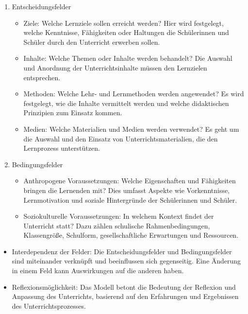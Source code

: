 \begin{enumerate}

	\item Entscheidungsfelder

		\begin{itemize}

			\item Ziele: Welche Lernziele sollen erreicht werden? Hier wird festgelegt, welche Kenntnisse, F\"{a}higkeiten oder Haltungen die Sch\"{u}lerinnen und Sch\"{u}ler durch den Unterricht erwerben sollen.

			\item Inhalte: Welche Themen oder Inhalte werden behandelt? Die Auswahl und Anordnung der Unterrichtsinhalte m\"{u}ssen den Lernzielen entsprechen.

			\item Methoden: Welche Lehr- und Lernmethoden werden angewendet? Es wird festgelegt, wie die Inhalte vermittelt werden und welche didaktischen Prinzipien zum Einsatz kommen.

			\item Medien: Welche Materialien und Medien werden verwendet? Es geht um die Auswahl und den Einsatz von Unterrichtsmaterialien, die den Lernprozess unterst\"{u}tzen.

		\end{itemize}



	\item Bedingungsfelder

		\begin{itemize}

			\item	 Anthropogene Voraussetzungen: Welche Eigenschaften und F\"{a}higkeiten bringen die Lernenden mit? Dies umfasst Aspekte wie Vorkenntnisse, Lernmotivation und soziale Hintergr\"{u}nde der Sch\"{u}lerinnen und Sch\"{u}ler.

			\item Soziokulturelle Voraussetzungen: In welchem Kontext findet der Unterricht statt? Dazu z\"{a}hlen schulische Rahmenbedingungen, Klassengr\"{o}{\ss}e, Schulform, gesellschaftliche Erwartungen und Ressourcen.

		\end{itemize}

\end{enumerate}	




\begin{itemize}

	\item Interdependenz der Felder: Die Entscheidungsfelder und Bedingungsfelder sind miteinander verkn\"{u}pft und beeinflussen sich gegenseitig. Eine \"{A}nderung in einem Feld kann Auswirkungen auf die anderen haben.

	\item Reflexionsm\"{o}glichkeit: Das Modell betont die Bedeutung der Reflexion und Anpassung des Unterrichts, basierend auf den Erfahrungen und Ergebnissen des Unterrichtsprozesses.

\end{itemize}	

